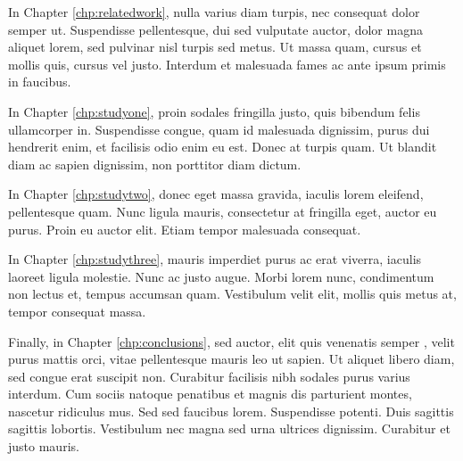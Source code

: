 In Chapter \ref{chp:relatedwork}, nulla varius diam turpis, nec consequat
dolor semper ut.  Suspendisse pellentesque, dui sed vulputate auctor, dolor
magna aliquet lorem, sed pulvinar nisl turpis sed metus.  Ut massa quam,
cursus et mollis quis, cursus vel justo.  Interdum et malesuada fames ac
ante ipsum primis in faucibus.

In Chapter \ref{chp:studyone}, proin sodales fringilla justo, quis bibendum
felis ullamcorper in.  Suspendisse congue, quam id malesuada dignissim,
purus dui hendrerit enim, et facilisis odio enim eu est.  Donec at turpis
quam.  Ut blandit diam ac sapien dignissim, non porttitor diam dictum.

In Chapter \ref{chp:studytwo}, donec eget massa gravida, iaculis lorem
eleifend, pellentesque quam.  Nunc ligula mauris, consectetur at fringilla
eget, auctor eu purus.  Proin eu auctor elit.  Etiam tempor malesuada
consequat.

In Chapter \ref{chp:studythree}, mauris imperdiet purus ac erat viverra,
iaculis laoreet ligula molestie.  Nunc ac justo augue.  Morbi lorem nunc,
condimentum non lectus et, tempus accumsan quam.  Vestibulum velit elit,
mollis quis metus at, tempor consequat massa.

Finally, in Chapter \ref{chp:conclusions}, sed auctor, elit quis venenatis
semper \cite{Anderson2005}, velit purus mattis orci, vitae pellentesque
mauris leo ut sapien.  Ut aliquet libero diam, sed congue erat suscipit non. 
Curabitur facilisis nibh sodales purus varius interdum.  Cum sociis natoque
penatibus et magnis dis parturient montes, nascetur ridiculus mus.  Sed sed
faucibus lorem.  Suspendisse potenti.  Duis sagittis sagittis lobortis. 
Vestibulum nec magna sed urna ultrices dignissim.  Curabitur et justo
mauris.